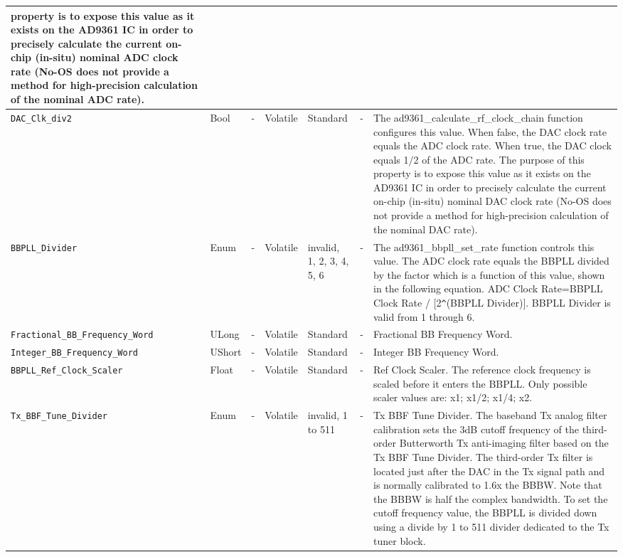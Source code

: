 \documentclass{article}
\begin{document}
\begin{landscape}
\begin{scriptsize}
\begin{longtable}{|p{3.6cm}|p{8.1cm}|p{1.4cm}|p{1.3cm}|p{1.4cm}|p{2.5cm}|p{3.6cm}|}
                                 property is to expose this value as it exists
                                 on the AD9361 IC in order to precisely
                                 calculate the current on-chip (in-situ) nominal
                                 ADC clock rate (No-OS does not provide a method
                                 for high-precision calculation of the nominal
                                 ADC rate). \\
			\hline
			\verb+DAC_Clk_div2+ & Bool & - & Volatile & Standard & - & 
                                The ad9361\_calculate\_rf\_clock\_chain
                                  function configures this value. When false,
                                  the DAC clock rate equals the ADC clock rate.
                                  When true, the DAC clock equals 1/2 of the ADC
                                  rate. The purpose of this property is to
                                  expose this value as it exists on the AD9361
                                  IC in order to precisely calculate the current
                                  on-chip (in-situ) nominal DAC clock rate
                                  (No-OS does not provide a method for
                                  high-precision calculation of the nominal DAC
                                  rate). \\
			\hline
			\verb+BBPLL_Divider+ & Enum & - & Volatile & invalid, 1, 2, 3, 4, 5, 6 & - & The ad9361\_bbpll\_set\_rate function controls this value. The ADC clock rate equals the BBPLL divided by the factor which is a function of this value, shown in the following equation. ADC Clock Rate=BBPLL Clock Rate / [2\texttt{\^}(BBPLL Divider)]. BBPLL Divider is valid from 1 through 6. \\
			\hline
			\verb+Fractional_BB_Frequency_Word+ & ULong & - & Volatile & Standard & - & Fractional BB Frequency Word. \\
			\hline
			\verb+Integer_BB_Frequency_Word+ & UShort & - & Volatile & Standard & - & Integer BB Frequency Word. \\
			\hline
			\verb+BBPLL_Ref_Clock_Scaler+ & Float & - & Volatile & Standard & - & Ref Clock Scaler. The reference clock frequency is scaled before it enters the BBPLL. Only possible scaler values are: x1; x1/2; x1/4; x2. \\
			\hline
			\verb+Tx_BBF_Tune_Divider+ & Enum & - & Volatile & invalid, 1 to 511 & - & Tx BBF Tune Divider. The baseband Tx analog filter calibration sets the 3dB cutoff frequency of the third-order Butterworth Tx anti-imaging filter based on the Tx BBF Tune Divider. The third-order Tx filter is located just after the DAC in the Tx signal path and is normally calibrated to 1.6x the BBBW. Note that the BBBW is half the complex bandwidth. To set the cutoff frequency value, the BBPLL is divided down using a divide by 1 to 511 divider dedicated to the Tx tuner block. \\

\end{longtable}
\end{scriptsize}
\end{landscape}
\end{document}

